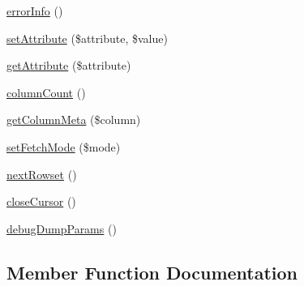 \begin{DoxyCompactItemize}
\item 
\mbox{\hyperlink{interface_pes_1_1_database_1_1_statement_1_1_p_d_o_statement_interface_ac5230ce6cd46c5e922146a441d807877}{error\+Info}} ()
\item 
\mbox{\hyperlink{interface_pes_1_1_database_1_1_statement_1_1_p_d_o_statement_interface_aa4ddbee482d43ef83316a45744be018e}{set\+Attribute}} (\$attribute, \$value)
\item 
\mbox{\hyperlink{interface_pes_1_1_database_1_1_statement_1_1_p_d_o_statement_interface_ac8ff6f1aa68f8462ac6c3593c8071cc6}{get\+Attribute}} (\$attribute)
\item 
\mbox{\hyperlink{interface_pes_1_1_database_1_1_statement_1_1_p_d_o_statement_interface_a1cd0e18d5cc164a888f7bb39d5811dd6}{column\+Count}} ()
\item 
\mbox{\hyperlink{interface_pes_1_1_database_1_1_statement_1_1_p_d_o_statement_interface_a91c1c5057a594be092e0bc2b579bf1eb}{get\+Column\+Meta}} (\$column)
\item 
\mbox{\hyperlink{interface_pes_1_1_database_1_1_statement_1_1_p_d_o_statement_interface_a4b9656d6a7e39776b44c1a930704b743}{set\+Fetch\+Mode}} (\$mode)
\item 
\mbox{\hyperlink{interface_pes_1_1_database_1_1_statement_1_1_p_d_o_statement_interface_a533b45a32352d0a4191485930967be0e}{next\+Rowset}} ()
\item 
\mbox{\hyperlink{interface_pes_1_1_database_1_1_statement_1_1_p_d_o_statement_interface_a1d97e408acd9cc0331091f8b15805085}{close\+Cursor}} ()
\item 
\mbox{\hyperlink{interface_pes_1_1_database_1_1_statement_1_1_p_d_o_statement_interface_a337eca30d2153ed05130b088d2ce266f}{debug\+Dump\+Params}} ()
\end{DoxyCompactItemize}


\subsection{Member Function Documentation}
\mbox{\label{interface_pes_1_1_database_1_1_statement_1_1_p_d_o_statement_interface_a4d6b474a6c1b9555d659597a73fb9b75}} 
